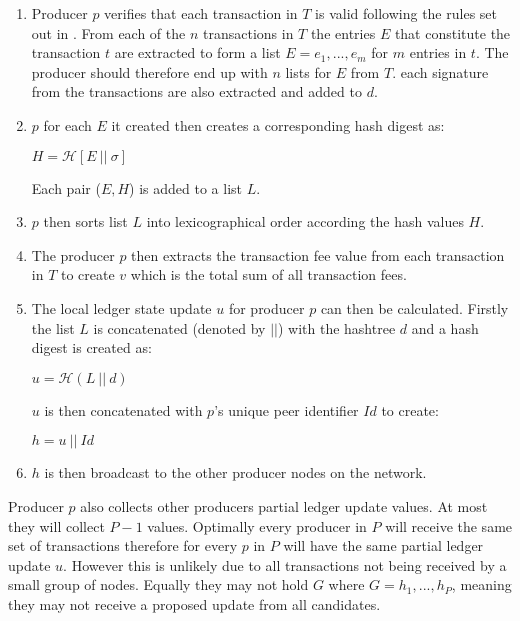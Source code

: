 \begin{enumerate}
\item Producer $p$ verifies that each transaction in $T$ is valid following the rules set out in \cite{transactionvalidator}. From each of the $n$ transactions in $T$ the entries $E$ that constitute the transaction $t$ are extracted to form a list $E = e_1,...,e_m$ for $m$ entries in $t$. The producer should therefore end up with $n$ lists for $E$ from $T$. each signature from the transactions are also extracted and added to $d$.

\item $p$ for each $E$ it created then creates a corresponding hash digest as:
\begin{center}
$H = \mathcal{H}[E~||~\sigma]$
\end{center}

Each pair ($E,H$) is added to a list $L$.

\item $p$ then sorts list $L$ into lexicographical order according the hash values $H$.

\item The producer $p$ then extracts the transaction fee value from each transaction in $T$ to create $v$ which is the total sum of all transaction fees.

\item The local ledger state update $u$ for producer $p$ can then be calculated. Firstly the list $L$ is concatenated (denoted by $||$) with the hashtree $d$ and a hash digest is created as:

\begin{center}
$u = \mathcal{H}(L~||~d)$
\end{center}

$u$ is then concatenated with $p$'s unique peer identifier $Id$ to create:

\begin{center}
$h = u ~||~Id$
\end{center}

\item $h$ is then broadcast to the other producer nodes on the network.
\end{enumerate}



Producer $p$ also collects other producers partial ledger update values. At most they will collect $P-1$ values. Optimally every producer in $P$ will receive the same set of transactions therefore for every $p$ in $P$ will have the same partial ledger update $u$. However this is unlikely due to all transactions not being received by a small group of nodes. Equally they may not hold $G$ where $G = h_1,...,h_P$, meaning they may not receive a proposed update from all candidates.
